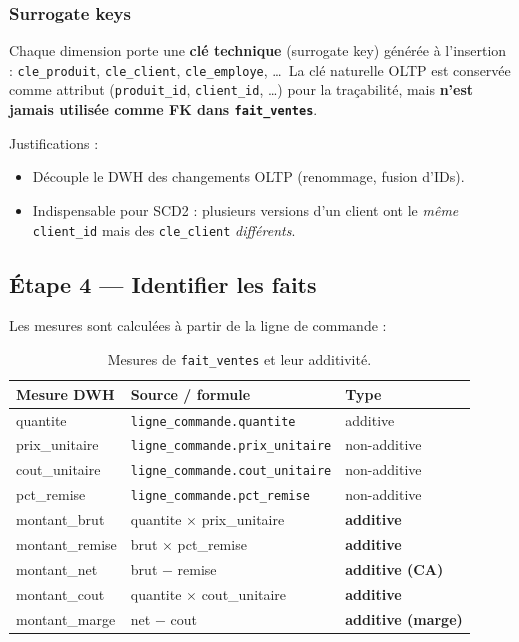\documentclass[11pt,a4paper]{article}
\newcommand{\code}[1]{\texttt{\small #1}}
\begin{document}
\subsubsection*{Surrogate keys}

Chaque dimension porte une \textbf{clé technique} (surrogate key) générée à
l'insertion : \code{cle\_produit}, \code{cle\_client}, \code{cle\_employe},
\dots\ La clé naturelle OLTP est conservée comme attribut
(\code{produit\_id}, \code{client\_id}, \dots) pour la traçabilité, mais
\textbf{n'est jamais utilisée comme FK dans \code{fait\_ventes}}.

Justifications :
\begin{itemize}
  \item Découple le DWH des changements OLTP (renommage, fusion d'IDs).
  \item Indispensable pour SCD2 : plusieurs versions d'un client ont le
        \emph{même} \code{client\_id} mais des \code{cle\_client}
        \emph{différents}.
\end{itemize}

\subsection{Étape 4 --- Identifier les faits}

Les mesures sont calculées à partir de la ligne de commande :

\begin{table}[h]
\centering\small
\begin{tabular}{l l l}\toprule
\textbf{Mesure DWH} & \textbf{Source / formule}                       & \textbf{Type}\\\midrule
quantite            & \code{ligne\_commande.quantite}                 & additive\\
prix\_unitaire      & \code{ligne\_commande.prix\_unitaire}           & non-additive\\
cout\_unitaire      & \code{ligne\_commande.cout\_unitaire}           & non-additive\\
pct\_remise         & \code{ligne\_commande.pct\_remise}              & non-additive\\
montant\_brut       & quantite $\times$ prix\_unitaire                & \textbf{additive}\\
montant\_remise     & brut $\times$ pct\_remise                       & \textbf{additive}\\
montant\_net        & brut $-$ remise                                 & \textbf{additive (CA)}\\
montant\_cout       & quantite $\times$ cout\_unitaire                & \textbf{additive}\\
montant\_marge      & net $-$ cout                                    & \textbf{additive (marge)}\\\bottomrule
\end{tabular}
\caption{Mesures de \texttt{fait\_ventes} et leur additivité.}
\end{table}
\end{document}
